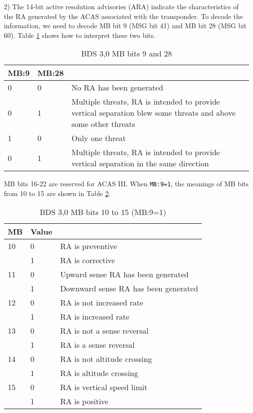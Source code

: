 2) The 14-bit active resolution advisories (ARA) indicate the characteristics of the RA generated by the ACAS associated with the transponder. To decode the information, we need to decode MB bit 9 (MSG bit 41) and MB bit 28 (MSG bit 60). Table \ref{tb:bds30_mb9_mb28} shows how to interpret these two bits.

\begin{table}[ht]
\centering
\caption{BDS 3,0 MB bits 9 and 28}
\label{tb:bds30_mb9_mb28}
\begin{tabular}{|l|l|p{7cm}|}
\hline
\textbf{MB:9} & \textbf{MB:28} & \textbf{} \\ \hline
0 & 0 & No RA has been generated \\ \hline
0 & 1 & Multiple threats, RA is intended to provide vertical separation blew some threats and above some other threats \\ \hline
1 & 0 & Only one threat \\ \hline
0 & 1 & Multiple threats, RA is intended to provide vertical separation in the same direction \\ \hline
\end{tabular}
\end{table}

MB bits 16-22 are reserved for ACAS III. When \texttt{MB:9=1}, the meanings of MB bits from 10 to 15 are shown in Table \ref{tb:bds30_mb10-22_1}.

\begin{table}[]
\centering
\caption{BDS 3,0 MB bits 10 to 15 (MB:9=1)}
\label{tb:bds30_mb10-22_1}
\begin{tabular}{|l|l|l|}
\hline
\textbf{MB} & \textbf{Value} & \textbf{} \\ \hline
10 & 0 & RA is preventive \\ \hline
 & 1 & RA is corrective \\ \hline
11 & 0 & Upward sense RA has been generated \\ \hline
 & 1 & Downward sense RA has been generated \\ \hline
12 & 0 & RA is not increased rate \\ \hline
 & 1 & RA is increased rate \\ \hline
13 & 0 & RA is not a sense reversal \\ \hline
 & 1 & RA is a sense reversal \\ \hline
14 & 0 & RA is not altitude crossing \\ \hline
 & 1 & RA is altitude crossing \\ \hline
15 & 0 & RA is vertical speed limit \\ \hline
 & 1 & RA is positive \\ \hline
\end{tabular}
\end{table}

